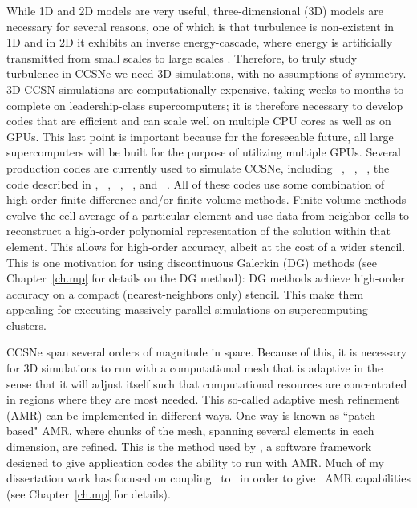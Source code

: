 While 1D and 2D models are very useful,
three-dimensional (3D) models are necessary for several reasons,
one of which is that turbulence is non-existent in 1D and in 2D it
exhibits an inverse energy-cascade, where energy is artificially transmitted
from small scales to large scales \citep{k1967}.
Therefore, to truly study turbulence in CCSNe we need 3D simulations,
with no assumptions of symmetry.
3D CCSN simulations are computationally expensive,
taking weeks to months to complete
on leadership-class supercomputers; it is therefore
necessary to develop codes that are efficient and can scale well on
multiple CPU cores as well as on GPUs.
This last point is important because for the foreseeable future, all
large supercomputers will be built for the purpose of utilizing
multiple GPUs.
Several production codes are currently used to simulate CCSNe, including
\flashx\ \citep{for2000},
\cocov\ \citep{mjd2010},
\zelmani\ \citep{oao2012},
the code described in \citet{ktk2016},
\fornax\ \citep{sdb2019},
\nadafld\ \citep{rjj2019},
\chimera\ \citep{bbh2020},
and \gmunu\ \citep{cht2023}.
All of these codes use some combination of high-order finite-difference
and/or finite-volume methods.
Finite-volume methods \citep[e.g., see][]{l2002} evolve the cell average
of a particular element and use data from neighbor cells to reconstruct
a high-order polynomial representation of the solution within that element.
This allows for high-order accuracy, albeit at the cost of a wider stencil.
This is one motivation for using discontinuous Galerkin (DG) methods
(see Chapter~\ref{ch.mp} for details on the DG method):
DG methods achieve high-order accuracy on a compact (nearest-neighbors only)
stencil.
This make them appealing for executing massively parallel simulations on
supercomputing clusters.

CCSNe span several orders of magnitude in space.
Because of this, it is necessary for 3D simulations to run with a computational
mesh that is adaptive in the sense that it will adjust itself such that
computational resources are concentrated in regions where they are most needed.
This so-called adaptive mesh refinement (AMR) can be implemented in different
ways.
One way is known as ``patch-based" AMR, where chunks of the mesh, spanning
several elements in each dimension, are refined.
This is the method used by \amrex, a software framework designed to give
application codes the ability to run with AMR.
Much of my dissertation work has focused on coupling \thornado\ to \amrex\ in
order to give \thornado\ AMR capabilities (see Chapter~\ref{ch.mp} for details).

